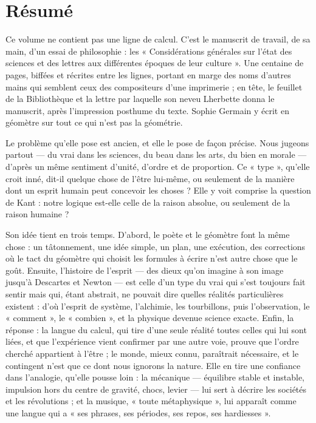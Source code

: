 \documentclass[11pt,a4paper]{article}
\begin{document}
\section*{Résumé}

\begin{resume}
Ce volume ne contient pas une ligne de calcul. C'est le manuscrit de travail,
de sa main, d'un essai de philosophie : les « Considérations générales sur l'état
des sciences et des lettres aux différentes époques de leur culture ». Une
centaine de pages, biffées et récrites entre les lignes, portant en marge des
noms d'autres mains qui semblent ceux des compositeurs d'une imprimerie ; en tête, le feuillet de la Bibliothèque et la
lettre par laquelle son neveu Lherbette donna le manuscrit, après l'impression
posthume du texte. Sophie Germain y écrit en géomètre sur tout ce qui n'est pas
la géométrie.

Le problème qu'elle pose est ancien, et elle le pose de façon précise. Nous
jugeons partout — du vrai dans les sciences, du beau dans les arts, du bien en
morale — d'après un même sentiment d'unité, d'ordre et de proportion. Ce
« type », qu'elle croit inné, dit-il quelque chose de l'être lui-même, ou
seulement de la manière dont un esprit humain peut concevoir les choses ? Elle y voit
comprise la question de Kant : notre logique est-elle celle de la raison
absolue, ou seulement de la raison humaine ?

Son idée tient en trois temps. D'abord, le poète et le géomètre font la même
chose : un tâtonnement, une idée simple, un plan, une exécution, des corrections
où le tact du géomètre qui choisit les formules à écrire n'est autre chose que le
goût. Ensuite, l'histoire de l'esprit — des dieux qu'on imagine à son image
jusqu'à Descartes et Newton — est celle d'un type du vrai qui s'est toujours fait
sentir mais qui, étant abstrait, ne pouvait dire quelles réalités particulières
existent : d'où l'esprit de système, l'alchimie, les tourbillons, puis
l'observation, le « comment », le « combien », et la physique devenue science
exacte. Enfin, la réponse : la langue du calcul, qui tire d'une seule réalité
toutes celles qui lui sont liées, et que l'expérience vient confirmer par une
autre voie, prouve que l'ordre cherché appartient à l'être ; le monde, mieux
connu, paraîtrait nécessaire, et le contingent n'est que ce dont nous ignorons la
nature. Elle en tire une confiance dans l'analogie, qu'elle pousse loin : la
mécanique — équilibre stable et instable, impulsion hors du centre de gravité,
chocs, levier — lui sert à décrire les sociétés et les révolutions ; et la
musique, « toute métaphysique », lui apparaît comme une langue qui a « ses
phrases, ses périodes, ses repos, ses hardiesses ».


\end{resume}
\end{document}
